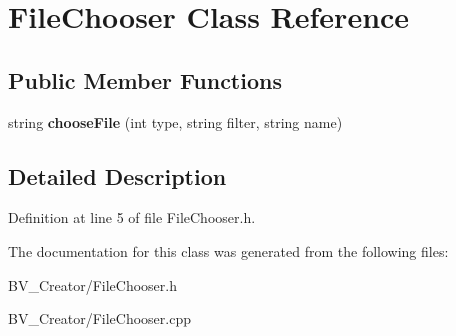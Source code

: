 \hypertarget{class_file_chooser}{
\section{FileChooser Class Reference}
\label{class_file_chooser}
}
\subsection*{Public Member Functions}
\begin{DoxyCompactItemize}
\item 
\hypertarget{class_file_chooser_ade59be41e3d6d328e544289ae32f0c87}{
string {\bfseries chooseFile} (int type, string filter, string name)}
\label{class_file_chooser_ade59be41e3d6d328e544289ae32f0c87}

\end{DoxyCompactItemize}


\subsection{Detailed Description}


Definition at line 5 of file FileChooser.h.

The documentation for this class was generated from the following files:\begin{DoxyCompactItemize}
\item 
BV\_\-Creator/FileChooser.h\item 
BV\_\-Creator/FileChooser.cpp\end{DoxyCompactItemize}
